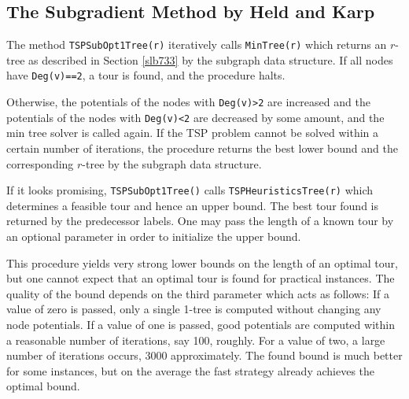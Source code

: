\documentclass[a4paper,11pt,twoside]{book}
\begin{document}
\begin{multicols}{2}
\bigskip
\begin{figurehere}
\begin{center}
\epsfxsize=4cm
\epsfxsize=4cm
\hspace*{1.5cm}
\vspace{0.5cm}
\caption{\label{flb_2opt}A 2-Opt Step}
\end{center}
\end{figurehere}


\subsection{The Subgradient Method by Held and Karp}
The method \verb/TSPSubOpt1Tree(r)/ iteratively calls \verb/MinTree(r)/ which
returns an $r$-tree as described in Section \ref{slb733} by the subgraph data
structure. If all nodes have \verb/Deg(v)==2/, a tour is found, and the
procedure halts.

\bigskip
\begin{figurehere}
\begin{center}
\epsfxsize=12cm
\vspace{0.5cm}
\caption{\label{flb_subgradient}An optimal 1-Tree which forms a tour}
\end{center}
\end{figurehere}

Otherwise, the potentials of the nodes with \verb/Deg(v)>2/ are increased
and the potentials of the nodes with \verb/Deg(v)<2/ are decreased by some
amount, and the min tree solver is called again. If the TSP problem cannot be
solved within a certain number of iterations, the procedure returns the best
lower bound and the corresponding $r$-tree by the subgraph data structure.

If it looks promising, \verb/TSPSubOpt1Tree()/ calls \verb/TSPHeuristicsTree(r)/
which determines a feasible tour and hence an upper bound.  The best tour found
is returned by the predecessor labels. One may pass the length of a known tour
by an optional parameter in order to initialize the upper bound.

This procedure yields very strong lower bounds on the length of an optimal tour,
but one cannot expect that an optimal tour is found for practical instances.
The quality of the bound depends on the third parameter which acts as follows:
If a value of zero is passed, only a single 1-tree is computed without changing
any node potentials. If a value of one is passed, good potentials are computed
within a reasonable number of iterations, say 100, roughly. For a value of two,
a large number of iterations occurs, 3000 approximately. The found bound is much
better for some instances, but on the average the fast strategy already achieves
the optimal bound.


\end{multicols}
\end{document}
